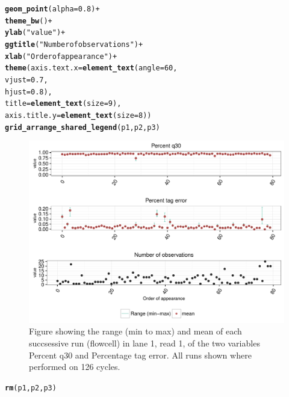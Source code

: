 \documentclass[a4paper,11pt,fleqn,twoside,notitlepage]{report}
\makeatletter
\def\maxwidth{ %
  \ifdim\Gin@nat@width>\linewidth
    \linewidth
  \else
    \Gin@nat@width
  \fi
}
\newcommand{\hlnum}[1]{\textcolor[rgb]{0.686,0.059,0.569}{#1}}%
\newcommand{\hlstr}[1]{\textcolor[rgb]{0.192,0.494,0.8}{#1}}%
\newcommand{\hlopt}[1]{\textcolor[rgb]{0,0,0}{#1}}%
\newcommand{\hlstd}[1]{\textcolor[rgb]{0.345,0.345,0.345}{#1}}%
\newcommand{\hlkwc}[1]{\textcolor[rgb]{0.333,0.667,0.333}{#1}}%
\newcommand{\hlkwd}[1]{\textcolor[rgb]{0.737,0.353,0.396}{\textbf{#1}}}%
\newenvironment{kframe}{%
 \def\at@end@of@kframe{}%
 \ifinner\ifhmode%
  \def\at@end@of@kframe{\end{minipage}}%
  \begin{minipage}{\columnwidth}%
 \fi\fi%
 \def\FrameCommand##1{\hskip\@totalleftmargin \hskip-\fboxsep
 \colorbox{shadecolor}{##1}\hskip-\fboxsep
     \hskip-\linewidth \hskip-\@totalleftmargin \hskip\columnwidth}%
 \MakeFramed {\advance\hsize-\width
   \@totalleftmargin\z@ \linewidth\hsize
   \@setminipage}}%
 {\par\unskip\endMakeFramed%
 \at@end@of@kframe}
\newenvironment{knitrout}{}{} %
\makeatother
\begin{document}
\begin{knitrout}
\begin{kframe}
\begin{alltt}
  \hlkwd{geom_point}\hlstd{(}\hlkwc{alpha}\hlstd{=}\hlnum{0.8}\hlstd{)} \hlopt{+}
  \hlkwd{theme_bw}\hlstd{()} \hlopt{+}
  \hlkwd{ylab}\hlstd{(}\hlstr{"value"}\hlstd{)} \hlopt{+}
  \hlkwd{ggtitle}\hlstd{(}\hlstr{"Number of observations"}\hlstd{)} \hlopt{+}
  \hlkwd{xlab}\hlstd{(}\hlstr{"Order of appearance"}\hlstd{)} \hlopt{+}
  \hlkwd{theme}\hlstd{(}\hlkwc{axis.text.x}\hlstd{=}\hlkwd{element_text}\hlstd{(}\hlkwc{angle}\hlstd{=}\hlnum{60}\hlstd{,}
                                 \hlkwc{vjust}\hlstd{=}\hlnum{0.7}\hlstd{,}
                                 \hlkwc{hjust}\hlstd{=}\hlnum{0.8}\hlstd{),}
        \hlkwc{title} \hlstd{=} \hlkwd{element_text}\hlstd{(}\hlkwc{size}\hlstd{=}\hlnum{9}\hlstd{),}
        \hlkwc{axis.title.y}\hlstd{=}\hlkwd{element_text}\hlstd{(}\hlkwc{size}\hlstd{=}\hlnum{8}\hlstd{))}
\hlkwd{grid_arrange_shared_legend}\hlstd{(p1,p2,p3)}
\end{alltt}
\end{kframe}\begin{figure}[!htb]
\includegraphics[width=\maxwidth]{figure/HiSeq6Comb-1} \caption[Figure showing the range (min to max) and mean of each succsessive run (flowcell) in lane 1, read 1, of the two variables Percent q30 and Percentage tag error]{Figure showing the range (min to max) and mean of each succsessive run (flowcell) in lane 1, read 1, of the two variables Percent q30 and Percentage tag error. All runs shown where performed on 126 cycles.}\label{fig:HiSeq6Comb}
\end{figure}

\begin{kframe}\begin{alltt}
\hlkwd{rm}\hlstd{(p1,p2,p3)}
\end{alltt}
\end{kframe}
\end{knitrout}
\end{document}
